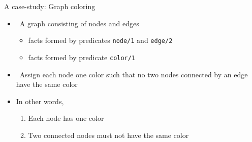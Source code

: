 % 

% 
% 
% 
% 
% 
% 
\begin{frame}{A case-study: Graph coloring}
  \bigskip
  \begin{itemize}
  \item<2->  \ A graph consisting of nodes and edges
    \begin{itemize}\normalsize
    \item<visible@4-> facts formed by predicates \texttt{node/1} and \texttt{edge/2}
    \item<only@5->    facts formed by predicate  \texttt{color/1}
    \end{itemize}
    \medskip
  \item<only@6->  \ Assign each node one color such that no two nodes connected
    by an edge have the same color
    \medskip
  \item<only@7-> [] In other words,
    \begin{enumerate}\normalsize
    \item Each node has one color
    \item Two connected nodes must not have the same color
    \end{enumerate}
  \end{itemize}
  \centering
\end{frame}

